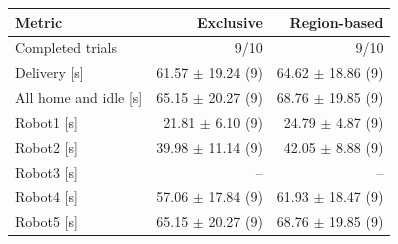 \begin{tabular}{@{}lrr@{}}
\toprule
Metric & Exclusive & Region-based \\
\midrule
Completed trials & 9/10 & 9/10 \\
\midrule
Delivery [s] & 61.57 $\pm$ 19.24 (9) & 64.62 $\pm$ 18.86 (9) \\
All home and idle [s] & 65.15 $\pm$ 20.27 (9) & 68.76 $\pm$ 19.85 (9) \\
Robot1 [s] & 21.81 $\pm$ 6.10 (9) & 24.79 $\pm$ 4.87 (9) \\
Robot2 [s] & 39.98 $\pm$ 11.14 (9) & 42.05 $\pm$ 8.88 (9) \\
Robot3 [s] & -- & -- \\
Robot4 [s] & 57.06 $\pm$ 17.84 (9) & 61.93 $\pm$ 18.47 (9) \\
Robot5 [s] & 65.15 $\pm$ 20.27 (9) & 68.76 $\pm$ 19.85 (9) \\
\bottomrule
\end{tabular}
